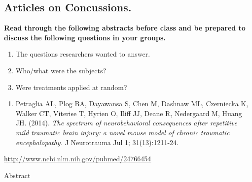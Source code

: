 \documentclass[
]{report}
\providecommand{\tightlist}{%
  \setlength{\itemsep}{0pt}\setlength{\parskip}{0pt}}
\begin{document}
\hypertarget{articles-on-concussions.}{%
\subsection*{Articles on Concussions.}\label{articles-on-concussions.}}

\textbf{Read through the following abstracts before class and be prepared to discuss the following questions in your groups.}

\begin{enumerate}
\def\labelenumi{(\alph{enumi})}
\item
  The questions researchers wanted to answer.
\item
  Who/what were the subjects?
\item
  Were treatments applied at random?
\end{enumerate}

\begin{enumerate}
\def\labelenumi{\arabic{enumi}.}
\tightlist
\item
  Petraglia AL, Plog BA, Dayawansa S, Chen M, Dashnaw ML, Czerniecka K, Walker CT, Viterise T, Hyrien O, Iliff JJ, Deane R, Nedergaard M, Huang JH. (2014). \emph{The spectrum of neurobehavioral consequences after repetitive mild traumatic brain injury: a novel mouse model of chronic traumatic encephalopathy.}
  J Neurotrauma Jul 1; 31(13):1211-24.
\end{enumerate}

\url{http://www.ncbi.nlm.nih.gov/pubmed/24766454}

Abstract
\end{document}
